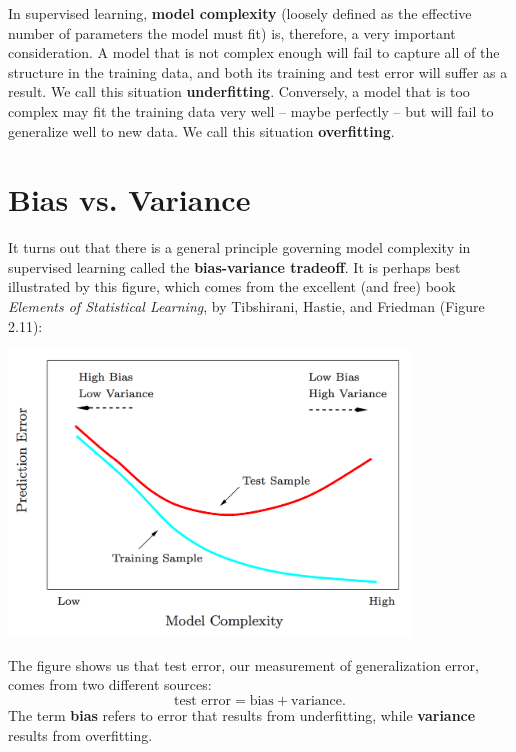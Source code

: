 In supervised learning, \textbf{model complexity} (loosely defined as the effective number of parameters the model must fit) is, therefore, a very important consideration. A model that is not complex enough will fail to capture all of the structure in the training data, and both its training and test error will suffer as a result. We call this situation \textbf{underfitting}. Conversely, a model that is too complex may fit the training data very well -- maybe perfectly -- but will fail to generalize well to new data. We call this situation \textbf{overfitting}. 


\section{Bias vs. Variance}

It turns out that there is a general principle governing model complexity in supervised learning called the \textbf{bias-variance tradeoff}. It is perhaps best illustrated by this figure, which comes from the excellent (and free) book \emph{Elements of Statistical Learning}, by Tibshirani, Hastie, and Friedman (Figure 2.11):

\begin{center}
\includegraphics[width=0.8\textwidth]{img/l03-bias-variance-tradeoff.png}
\end{center}

The figure shows us that test error, our measurement of generalization error, comes from two different sources:
$$ \text{test error} = \text{bias} + \text{variance}. $$
The term \textbf{bias} refers to error that results from underfitting, while \textbf{variance} results from overfitting. 

